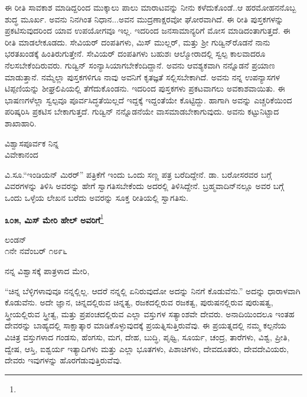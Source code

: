 ಈ ರೀತಿ ಸಾವಕಾಶ ಮಾಡಿದ್ದರಿಂದ ಮುಕ್ಕಾಲು ಪಾಲು ಮಾರಾಟವನ್ನು ನೀನು ಕಳೆದುಕೊಂಡೆ..ಆ ಹರಮೋಹನನೊಬ್ಬ ಶುದ್ಧ ಮೂರ್ಖ. ಅವನು ನಿನಗಿಂತ ನಿಧಾನ...ಅವನ ಮುದ್ರಣಾಕ್ಷರವೋ ಘೋರವಾಗಿದೆ. ಈ ರೀತಿ ಪುಸ್ತಕಗಳನ್ನು ಪ್ರಕಟಿಸುವುದರಿಂದ ಯಾವ ಉಪಯೋಗವೂ ಇಲ್ಲ. ಇದರಿಂದ ಜನಸಾಮಾನ್ಯರಿಗೆ ಮೋಸ ಮಾಡಿದಂತಾಗುತ್ತದೆ. ಈ ರೀತಿ ಮಾಡಲೇಕೂಡದು. ಸೇವಿಯರ್ ದಂಪತಿಗಳು, ಮಿಸ್ ಮುಲ್ಲರ್, ಮತ್ತು ಶ‍್ರೀ ಗುಡ್ವಿನ್‌ರೊಡನೆ ನಾನು ಭರತಖಂಡಕ್ಕೆ ಹಿಂತಿರುಗುತ್ತೇನೆ. ಸೇವಿಯರ್ ದಂಪತಿಗಳು ಬಹುಶಃ ಆಲ್ಮೋರಾದಲ್ಲಿ ಸ್ವಲ್ಪ ಕಾಲವಾದರೂ ನೆಲಸಬೇಕೆಂದಿರುವರು. ಗುಡ್ವಿನ್ ಸಂನ್ಯಾಸಿಯಾಗಬೇಕೆಂದಿದ್ದಾನೆ. ಅವನು ಆವಶ್ಯಕವಾಗಿ ನನ್ನೊಡನೆ ಪ್ರಯಾಣ ಮಾಡುತ್ತಾನೆ. ನಮ್ಮೆಲ್ಲಾ ಪುಸ್ತಕಗಳಿಗೂ ನಾವು ಅವನಿಗೆ ಕೃತಜ್ಞತೆ ಸಲ್ಲಿಸಬೇಕಾಗಿದೆ. ಅವನು ನನ್ನ ಉಪನ್ಯಾಸಗಳ ಟಿಪ್ಪಣಿಯನ್ನು ಶೀಘ್ರಲಿಪಿಯಲ್ಲಿ ತೆಗೆದುಕೊಂಡನು. ಇದರಿಂದ ಪುಸ್ತಕಗಳು ಪ್ರಕಟವಾಗಲು ಅವಕಾಶವಾಯಿತು. ಈ ಭಾಷಣಗಳೆಲ್ಲಾ ಸ್ವಲ್ಪವೂ ಪೂರ್ವಸಿದ್ಧತೆಯಿಲ್ಲದೆ ಇದ್ದಕ್ಕೆ ಇದ್ದಂತೆಯೇ ಕೊಟ್ಟಿದ್ದು. ಹಾಗಾಗಿ ಅವನ್ನು ಎಚ್ಚರಿಕೆಯಿಂದ ಪರಿಷ್ಕರಿಸಿ ಪ್ರಕಟಿಸ ಬೇಕಾಗುತ್ತದೆ. ಗುಡ್ವಿನ್ ನನ್ನೊಡನೆಯೇ ವಾಸಮಾಡಬೇಕಾಗುವುದು. ಅವನು ಕಟ್ಟುನಿಟ್ಟಾದ ಶಾಖಾಹಾರಿ.
\vspace{-0.3cm}

\begin{flushright}
ವಿಶ್ವಾಸಪೂರ್ವಕ ನಿನ್ನ\\ವಿವೇಕಾನಂದ
\end{flushright}

ವಿ.ಸೂ.\enginline{-}“ಇಂಡಿಯನ್ ಮಿರರ್” ಪತ್ರಿಕೆಗೆ ಇಂದು ಒಂದು ಸಣ್ಣ ಪತ್ರ ಬರೆದಿದ್ದೇನೆ. ಡಾ. ಬರೋಸರವರ ಬಗ್ಗೆ ವಿವರಗಳನ್ನು ತಿಳಿಸಿ ಅವರನ್ನು ಹೇಗೆ ಸ್ವಾಗತಿಸಬೇಕೆಂದು ಅದರಲ್ಲಿ ತಿಳಿಸಿದ್ದೇನೆ. ಬ್ರಹ್ಮವಾದಿನ್‌ನಲ್ಲೂ ಅವರ ಬಗ್ಗೆ ಒಂದು ಒಳ್ಳೆಯ ಲೇಖನ ಬರೆದು ಅವರನ್ನು ಸೂಕ್ತ ರೀತಿಯಲ್ಲಿ ಸ್ವಾಗತಿಸು.

\begin{center}
\textbf{೩೦೫, ಮಿಸ್ ಮೇರಿ ಹೇಲ್‌ ಅವರಿಗೆ}\footnote{}
\end{center}
\vspace{-0.3cm}

\begin{flushright}
ಲಂಡನ್\\೧ನೇ ನವೆಂಬರ್ ೧೮೯೬
\end{flushright}
\vspace{-0.3cm}

\noindent
ನನ್ನ ವಿಶ್ವಾಸಕ್ಕೆ ಪಾತ್ರಳಾದ ಮೇರಿ,

“ಚಿನ್ನ ಬೆಳ್ಳಿಗಳಾವುವೂ ನನ್ನಲ್ಲಿಲ್ಲ. ಆದರೆ ನನ್ನಲ್ಲಿ ಏನಿರುವುದೋ ಅದನ್ನು ನಿನಗೆ ಕೊಡುವೆನು.” ಅದನ್ನು ಧಾರಾಳವಾಗಿ ಕೊಡುವೆನು. ಅದೇ ಜ್ಞಾನ, ಚಿನ್ನದಲ್ಲಿರುವ ಚಿನ್ನತ್ವ, ರಜಕದಲ್ಲಿರುವ ರಜಕತ್ವ, ಪುರುಷನಲ್ಲಿರುವ ಪುರುಷತ್ವ, ಸ್ತ್ರೀಯಲ್ಲಿರುವ ಸ್ತ್ರೀತ್ವ, ಮತ್ತು ಪ್ರಪಂಚದಲ್ಲಿರುವ ಎಲ್ಲಾ ವಸ್ತುಗಳ ಸತ್ಯಾಂಶವೇ ದೇವರು. ಅನಾದಿಯಿಂದಲೂ ಇಂತಹ ದೇವರನ್ನು ಬಾಹ್ಯದಲ್ಲಿ ಸಾಕ್ಷಾತ್ಕಾರ ಮಾಡಿಕೊಳ್ಳುವುದಕ್ಕೆ ಪ್ರಯತ್ನಿಸುತ್ತಿರುವೆವು. ಈ ಪ್ರಯತ್ನದಲ್ಲಿ ನಮ್ಮ ಕಲ್ಪನೆಯ ವಿಚಿತ್ರ ವಸ್ತುಗಳಾದ ಗಂಡಸು, ಹೆಂಗಸು, ಮಗ, ದೇಹ, ಬುದ್ಧಿ, ಪೃಥ್ವಿ, ಸೂರ್ಯ, ಚಂದ್ರ, ತಾರೆಗಳು, ವಿಶ್ವ, ಪ್ರೀತಿ, ದ್ವೇಷ, ಆಸ್ತಿ, ಐಶ್ವರ್ಯ ಇತ್ಯಾದಿಗಳು ಮತ್ತು ಎಲ್ಲಾ ಭೂತಗಳು, ಪಿಶಾಚಿಗಳು, ದೇವದೂತರು, ದೇವದೇವಿಯರು, ದೇವರು ಇವುಗಳನ್ನು ಹೊರಗೆಡುವುತ್ತಿರುವೆವು.

